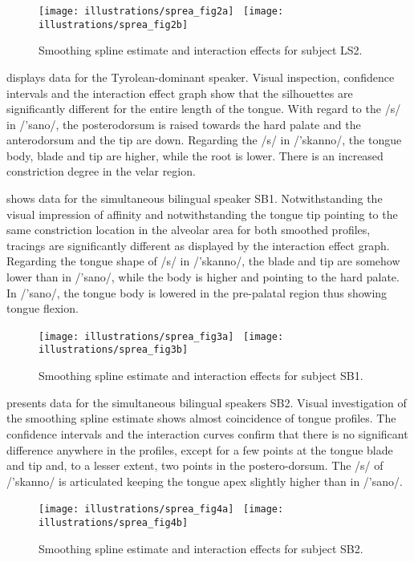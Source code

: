 \documentclass[output=paper]{LSP/langsci}
\begin{document}
\begin{figure}
\texttt{[image: illustrations/sprea\_fig2a]}~
\texttt{[image: illustrations/sprea\_fig2b]}
\label{fig:2}   
\caption{Smoothing spline estimate and interaction effects for subject LS2.}
\end{figure}


 displays data for the Tyrolean-dominant speaker. Visual inspection, confidence intervals and the interaction effect graph show that the silhouettes are significantly different for the entire length of the tongue. With regard to the /s/ in /'sano/, the posterodorsum is raised towards the hard palate and the anterodorsum and the tip are down. Regarding the /s/ in /'skanno/, the tongue body, blade and tip are higher, while the root is lower. There is an increased constriction degree in the velar region.

 shows data for the simultaneous bilingual speaker SB1. Notwithstanding the visual impression of affinity and notwithstanding the tongue tip pointing to the same constriction location in the alveolar area for both smoothed profiles, tracings are significantly different as displayed by the interaction effect graph. Regarding the tongue shape of /s/ in /'skanno/, the blade and tip are somehow lower than in /'sano/, while the body is higher and pointing to the hard palate. In /'sano/, the tongue body is lowered in the pre-palatal region thus showing tongue flexion.

  
\begin{figure}
\texttt{[image: illustrations/sprea\_fig3a]}~
\texttt{[image: illustrations/sprea\_fig3b]}
\label{fig:3}   
\caption{Smoothing spline estimate and interaction effects for subject SB1.}
\end{figure}

 presents data for the simultaneous bilingual speakers SB2. Visual investigation of the smoothing spline estimate shows almost coincidence of tongue profiles. The confidence intervals and the interaction curves confirm that there is no significant difference anywhere in the profiles, except for a few points at the tongue blade and tip and, to a lesser extent, two points in the postero-dorsum. The /s/ of /'skanno/ is articulated keeping the tongue apex slightly higher than in /'sano/.

  
\begin{figure}
\texttt{[image: illustrations/sprea\_fig4a]}~
\texttt{[image: illustrations/sprea\_fig4b]}
\label{fig:4}   
\caption{Smoothing spline estimate and interaction effects for subject SB2.}
\end{figure}
\end{document}

